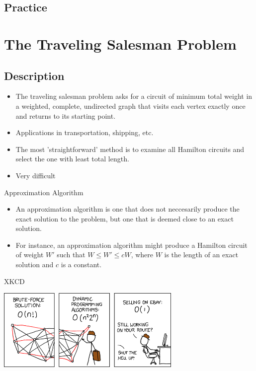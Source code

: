\documentclass{beamer}
\begin{document}
\subsection{Practice}

\section{The Traveling Salesman Problem}
\subsection{Description}
\begin{frame}
	\begin{itemize}
	\item
		The \alert{traveling salesman problem} asks for a circuit of minimum total weight in a weighted, complete, undirected graph that visits each vertex exactly once and returns to its starting point.
	\item
		Applications in transportation, shipping, etc.
	\item
		The most 'straightforward' method is to examine all Hamilton circuits and select the one with least total length.
	\item
		Very difficult
	\end{itemize}
\end{frame}

\begin{frame}{Approximation Algorithm}
	\begin{itemize}
	\item
		An \alert{approximation algorithm} is one that does not neccesarily produce the exact solution to the problem, but one that is deemed close to an exact solution.
	\item
		For instance, an approximation algorithm might produce a Hamilton circuit of weight $W'$ such that $W \leq W' \leq cW$, where $W$ is the length of an exact solution and $c$ is a constant.
	\end{itemize}
\end{frame}
\begin{frame}{XKCD}
\centerline{\includegraphics[width=3.5in]{travelling_salesman_problem.png}}
\end{frame}
\end{document}
